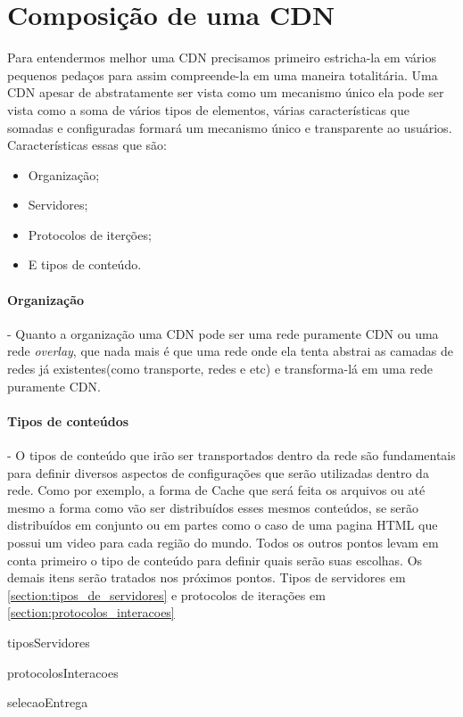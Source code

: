 \section{Composi\c{c}\~ao de uma CDN} \label{sec:composicao}
Para entendermos melhor uma CDN precisamos primeiro estricha-la em v\'arios pequenos peda\c{c}os para assim compreende-la em uma maneira totalit\'aria.
\newline
Uma CDN apesar de abstratamente ser vista como um mecanismo \'unico ela pode ser vista como a soma de v\'arios tipos de elementos, v\'arias caracter\'isticas que somadas e configuradas formar\'a um mecanismo \'unico e transparente ao usu\'arios. Caracter\'isticas essas que s\~ao:
\begin{itemize}
\item Organiza\c{c}\~ao;
\item Servidores;
\item Protocolos de iter\c{c}\~oes;
\item E tipos de conte\'udo.
\end{itemize}

\paragraph{Organiza\c{c}\~ao}- Quanto a organiza\c{c}\~ao uma CDN pode ser uma rede puramente CDN ou uma rede \textit{overlay}, que nada mais \'e que uma rede onde ela tenta abstrai as camadas de redes j\'a existentes(como transporte, redes e etc) e transforma-l\'a em uma rede puramente CDN.

\paragraph{Tipos de conte\'udos}- O tipos de conte\'udo que ir\~ao ser transportados dentro da rede s\~ao fundamentais para definir diversos aspectos de configura\c{c}\~oes que ser\~ao utilizadas dentro da rede. Como por exemplo, a forma de Cache que ser\'a feita os arquivos ou at\'e mesmo a forma como v\~ao ser distribu\'idos esses mesmos conte\'udos, se ser\~ao distribu\'idos em conjunto ou em partes como o caso de uma pagina HTML que possui um video para cada regi\~ao do  mundo. Todos os outros pontos levam em conta primeiro o tipo de conte\'udo para definir quais ser\~ao suas escolhas.
\newline
Os demais itens ser\~ao tratados nos pr\'oximos pontos. Tipos de servidores em \ref{section:tipos_de_servidores} e protocolos de itera\c{c}\~oes em \ref{section:protocolos_interacoes}

{tiposServidores}

{protocolosInteracoes}

{selecaoEntrega}
